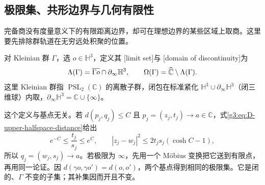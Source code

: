 \subsection{极限集、共形边界与几何有限性}
\label{g3:subsec:D04:05}

完备商没有度量意义下的有限距离边界，却可在理想边界的某些区域上取商。这里要先排除群轨道在无穷远处积聚的位置。

\begin{definition}\label{g3:def:D-kleinian-limit-set}
	对 Kleinian 群 \(\Gamma\)，选 \(o\in\mathbb H^3\)，定义其
	[limit set]与
	[domain of discontinuity]为
	\[
		\Lambda(\Gamma)
		  =\overline{\Gamma o}\cap\partial_\infty\mathbb H^3,
		\qquad
		\Omega(\Gamma)=\widehat{\mathbb C\mkern0mu}\setminus\Lambda(\Gamma).
	\]
	这里 Kleinian 群指 \(\operatorname{PSL}_2(\mathbb C)\) 的离散子群，闭包在标准紧化 \(\mathbb H^3\cup\partial_\infty\mathbb H^3\)（闭三维球）内取，\(\partial_\infty\mathbb H^3=\mathbb C\cup\{\infty\}\)。
\end{definition}

这个定义与基点无关。若 \(d(p_j,q_j)\le C\) 且
\(p_j=(z_j,t_j)\to a\in\mathbb C\)，式\eqref{g3:eq:D-upper-halfspace-distance}给出
\[
	e^{-C}\le\frac{t_j}{s_j}\le e^C,\qquad
	|z_j-w_j|^2\le2t_js_j(\cosh C-1),
\]
所以 \(q_j=(w_j,s_j)\to a\)。若极限为 \(\infty\)，先用一个 Möbius 变换把它送到有限点，再用同一论证。因
\(d(\gamma o,\gamma o')=d(o,o')\)，两个基点得到相同的极限集。它是闭的、\(\Gamma\) 不变的子集；其补集因而开且不变。

